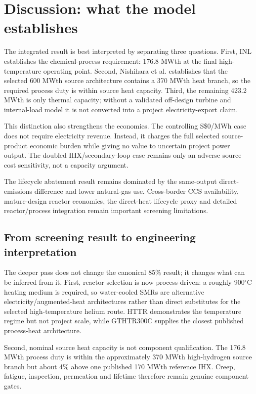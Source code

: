 \section{Discussion: what the model establishes}
The integrated result is best interpreted by separating three questions. First, INL establishes the chemical-process requirement: 176.8 MWth at the final high-temperature operating point. Second, Nishihara et al. establishes that the selected 600 MWth source architecture contains a 370 MWth heat branch, so the required process duty is within source heat capacity. Third, the remaining 423.2 MWth is only thermal capacity; without a validated off-design turbine and internal-load model it is not converted into a project electricity-export claim.

This distinction also strengthens the economics. The controlling S\$0/MWh case does not require electricity revenue. Instead, it charges the full selected source-product economic burden while giving no value to uncertain project power output. The doubled IHX/secondary-loop case remains only an adverse source cost sensitivity, not a capacity argument.

The lifecycle abatement result remains dominated by the same-output direct-emissions difference and lower natural-gas use. Cross-border CCS availability, mature-design reactor economics, the direct-heat lifecycle proxy and detailed reactor/process integration remain important screening limitations.


\subsection{From screening result to engineering interpretation}
The deeper pass does not change the canonical 85\% result; it changes what can be inferred from it.  First, reactor selection is now process-driven: a roughly 900$^\circ$C heating medium is required, so water-cooled SMRs are alternative electricity/augmented-heat architectures rather than direct substitutes for the selected high-temperature helium route.  HTTR demonstrates the temperature regime but not project scale, while GTHTR300C supplies the closest published process-heat architecture.

Second, nominal source heat capacity is not component qualification.  The 176.8 MWth process duty is within the approximately 370 MWth high-hydrogen source branch but about 4\% above one published 170 MWth reference IHX.  Creep, fatigue, inspection, permeation and lifetime therefore remain genuine component gates.

